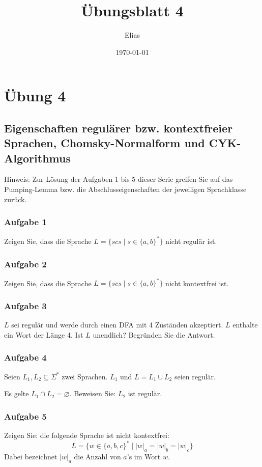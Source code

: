 \documentclass[a4paper,14pt,ngerman]{scrartcl}
\author{Elias}
\date{\today}
\title{Übungsblatt 4}
\begin{document}
\section{\textbf{Übung 4}}
\label{sec:org769b570}
\subsection{\textbf{Eigenschaften regulärer bzw. kontextfreier Sprachen, Chomsky-Normalform und CYK-Algorithmus}}
\label{sec:orgb12bf3d}

Hinweis: Zur Lösung der Aufgaben 1 bis 5 dieser Serie greifen Sie auf
das Pumping-Lemma bzw. die Abschlusseigenschaften der jeweiligen
Sprachklasse zurück.
\subsubsection{\textbf{Aufgabe 1}}
\label{sec:org1932083}

Zeigen Sie, dass die Sprache \(L= \{scs \mid s \in \{a, b\}^* \}\) nicht
regulär ist.
\subsubsection{\textbf{Aufgabe 2}}
\label{sec:orgb3a3c4b}

Zeigen Sie, dass die Sprache \(L= \{scs \mid s \in \{a, b\}^* \}\) nicht
kontextfrei ist.
\subsubsection{\textbf{Aufgabe 3}}
\label{sec:org6204292}

\(L\) sei regulär und werde durch einen DFA mit 4 Zuständen akzeptiert.
\(L\) enthalte ein Wort der Länge 4. Ist \(L\) unendlich? Begründen Sie
die Antwort.
\subsubsection{\textbf{Aufgabe 4}}
\label{sec:org4020f35}

Seien \(L_1, L_2 \subseteq \Sigma^*\) zwei Sprachen. \(L_1\) und
\(L=L_1 \cup L_2\) seien regulär.

Es gelte \(L_1 \cap L_2 = \varnothing\). Beweisen Sie: \(L_2\) ist
regulär.
\subsubsection{\textbf{Aufgabe 5}}
\label{sec:org20dd90a}

Zeigen Sie: die folgende Sprache ist nicht kontextfrei:
\[L=\{w \in \{a, b, c\}^* \mid |w|_a=|w|_b=|w|_c\}\] Dabei bezeichnet
\(|w|_a\) die Anzahl von \(a\)'s im Wort \(w\).
\end{document}
